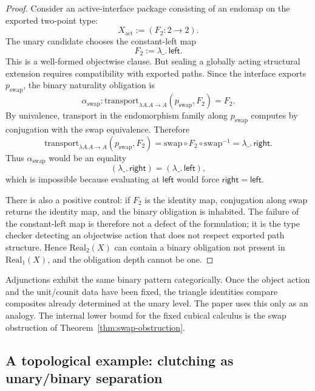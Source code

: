 \begin{proof}
Consider an active-interface package consisting of an endomap on the exported two-point
type:
\[
  X_{\mathrm{act}} := (F_2 : 2\to 2).
\]
The unary candidate chooses the constant-left map
\[
  F_2 := \lambda\_.\,\mathsf{left}.
\]
This is a well-formed objectwise clause.  But sealing a globally acting structural extension
requires compatibility with exported paths.  Since the interface exports
\(p_{\mathrm{swap}}\), the binary naturality obligation is
\[
  \alpha_{\mathrm{swap}}:
  \mathrm{transport}_{\lambda A. A\to A}(p_{\mathrm{swap}},F_2)=F_2.
\]
By univalence, transport in the endomorphism family along \(p_{\mathrm{swap}}\) computes by
conjugation with the swap equivalence.  Therefore
\[
  \mathrm{transport}_{\lambda A. A\to A}(p_{\mathrm{swap}},F_2)
  =
  \mathrm{swap}\circ F_2\circ \mathrm{swap}^{-1}
  =
  \lambda\_.\,\mathsf{right}.
\]
Thus \(\alpha_{\mathrm{swap}}\) would be an equality
\[
  (\lambda\_.\,\mathsf{right})=(\lambda\_.\,\mathsf{left}),
\]
which is impossible because evaluating at \(\mathsf{left}\) would force
\(\mathsf{right}=\mathsf{left}\).

There is also a positive control: if \(F_2\) is the identity map, conjugation along swap
returns the identity map, and the binary obligation is inhabited.  The failure of the
constant-left map is therefore not a defect of the formulation; it is the type checker
detecting an objectwise action that does not respect exported path structure.  Hence
\(\mathrm{Real}_2(X)\) can contain a binary obligation not present in \(\mathrm{Real}_1(X)\),
and the obligation depth cannot be one.
\end{proof}

\begin{remark}
Adjunctions exhibit the same binary pattern categorically.  Once the object action and the
unit/counit data have been fixed, the triangle identities compare composites already
determined at the unary level.  The paper uses this only as an analogy.  The internal lower
bound for the fixed cubical calculus is the swap obstruction of
Theorem~\ref{thm:swap-obstruction}.
\end{remark}

\subsection{A topological example: clutching as unary/binary separation}
\label{subsec:clutching-example}

